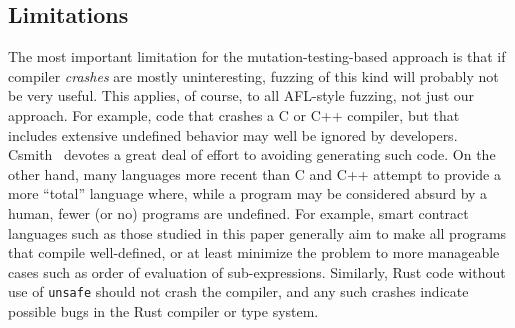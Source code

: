 \subsection{Limitations}

The most important limitation for the mutation-testing-based approach is that if compiler \emph{crashes} are mostly uninteresting, fuzzing of this kind will probably not be very useful.  This applies, of course, to all AFL-style fuzzing, not just our approach.  For example, code that crashes a C or C++ compiler, but that includes extensive undefined behavior may well be ignored by developers.  Csmith~\cite{csmith} devotes a great deal of effort to avoiding generating such code.  On the other hand, many languages more recent than C and C++ attempt to provide a more ``total'' language where, while a program may be considered absurd by a human, fewer (or no) programs are undefined.  For example, smart contract languages such as those studied in this paper generally aim to make all programs that compile well-defined, or at least minimize the problem to more manageable cases such as order of evaluation of sub-expressions.  Similarly, Rust code without use of {\tt unsafe} should not crash the compiler, and any such crashes indicate possible bugs in the Rust compiler or type system.  
